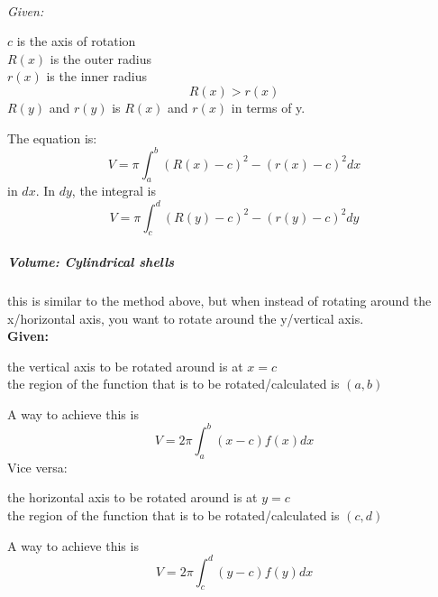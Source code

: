 \documentclass{article} %
\theoremstyle{theorem}
\theoremstyle{definition}
\begin{document}
                  \\\textit{Given:}
                    \begin{center}
                        $c$ is the axis of rotation\\
                        $R(x)$ is the outer radius\\ 
                        $r(x)$ is the inner radius $$R(x)>r(x)$$
                        $R(y)$ and $r(y)$ is $R(x)$ and $r(x)$ in terms of y.
                    \end{center}
                    The equation is:
                      \begin{equation}
                        \label{eq:volDonutDx}
                          V=\pi\int_a^b (R(x)-c)^2-(r(x)-c)^2dx
                      \end{equation}
                    in $dx$. In $dy$, the integral is 
                    \begin{equation}
                        \label{eq:volDonutDy}
                        V=\pi\int_c^d (R(y)-c)^2-(r(y)-c)^2dy
                    \end{equation}
                \subparagraph{Volume: Cylindrical shells}
                this is similar to the method above, but when instead of rotating around the x/horizontal axis, you want to rotate around the y/vertical axis. \\\textbf{Given:}
                    \begin{center}
                        the vertical axis to be rotated around is at $x=c$\\
                        the region of the function that is to be rotated/calculated is $(a,b)$
                    \end{center}
                    A way to achieve this is
                    \begin{equation}
                        \label{eq:volCylDX}
                        V=2\pi\int_a^b(x-c)f(x)dx
                    \end{equation}
                    Vice versa:
                    \begin{center}
                        the horizontal axis to be rotated around is at $y=c$\\
                        the region of the function that is to be rotated/calculated is $(c,d)$
                    \end{center}
                    A way to achieve this is
                    \begin{equation}
                        \label{eq:volCylDX}
                        V=2\pi\int_c^d(y-c)f(y)dx
                    \end{equation}
\end{document}
